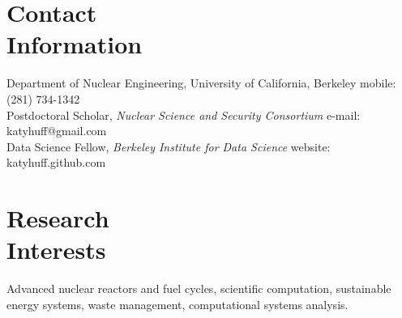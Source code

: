 \documentclass[margin,line]{resume}
\begin{document}
\begin{resume}


    \section{\mysidestyle Contact\\Information}

    Department of Nuclear Engineering, University of California, Berkeley       \hfill mobile: (281) 734-1342           \vspace{0mm}\\\vspace{0mm}%
    Postdoctoral Scholar, \textsl{Nuclear Science and Security Consortium}       \hfill e-mail: katyhuff@gmail.com            \vspace{0mm}\\\vspace{0mm}%
    Data Science Fellow, \textsl{Berkeley Institute for Data Science}           \hfill website: katyhuff.github.com     \vspace{0mm}\\\vspace{-4.5mm}%

    \section{\mysidestyle Research\\Interests}
		Advanced nuclear reactors and fuel cycles, scientific 
                computation, sustainable energy systems, waste 
                management, computational systems analysis. %

\end{resume}
\end{document}
